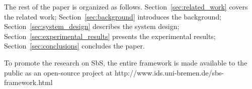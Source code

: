 The rest of the paper is organized as follows. Section~\ref{sec:related_work} covers the related work; Section~\ref{sec:background} introduces the background; Section~\ref{sec:system_design} describes the system design; Section~\ref{sec:experimental_results} presents the experimental results; Section~\ref{sec:conclusions} concludes the paper.


To promote the research on SbS, the entire framework is made available to the public as an open-source project at http://www.ids.uni-bremen.de/sbs-framework.html

